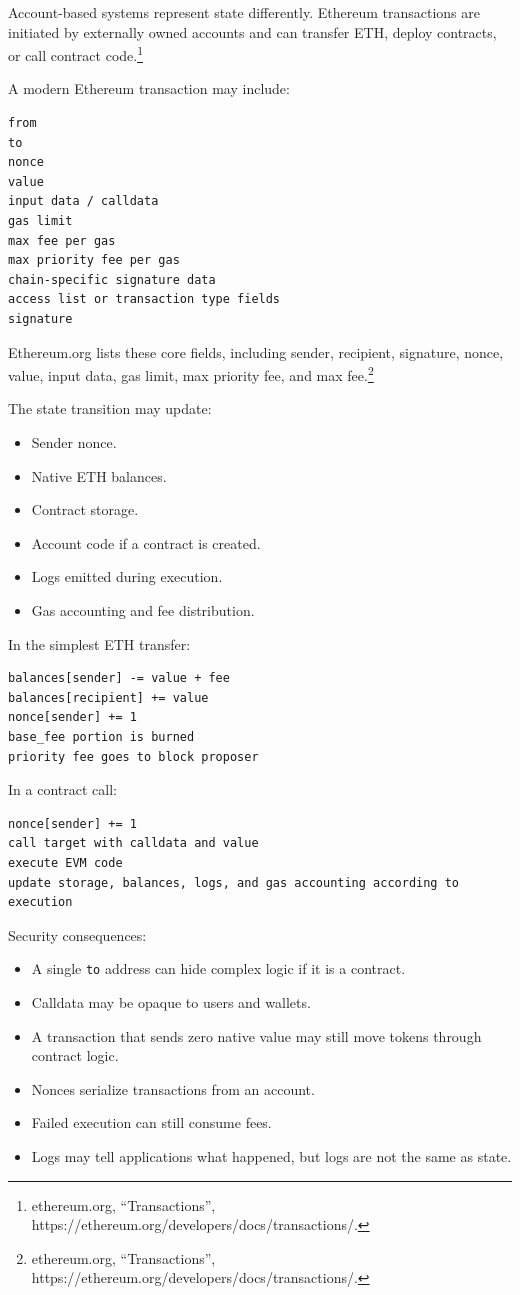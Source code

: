 Account-based systems represent state differently. Ethereum transactions
are initiated by externally owned accounts and can transfer ETH, deploy
contracts, or call contract code.\footnote{ethereum.org,
  ``Transactions'', https://ethereum.org/developers/docs/transactions/.}

A modern Ethereum transaction may include:

\begin{lstlisting}
from
to
nonce
value
input data / calldata
gas limit
max fee per gas
max priority fee per gas
chain-specific signature data
access list or transaction type fields
signature
\end{lstlisting}

Ethereum.org lists these core fields, including sender, recipient,
signature, nonce, value, input data, gas limit, max priority fee, and
max fee.\footnote{ethereum.org, ``Transactions'',
  https://ethereum.org/developers/docs/transactions/.}

The state transition may update:

\begin{itemize}
\tightlist
\item
  Sender nonce.
\item
  Native ETH balances.
\item
  Contract storage.
\item
  Account code if a contract is created.
\item
  Logs emitted during execution.
\item
  Gas accounting and fee distribution.
\end{itemize}

In the simplest ETH transfer:

\begin{lstlisting}
balances[sender] -= value + fee
balances[recipient] += value
nonce[sender] += 1
base_fee portion is burned
priority fee goes to block proposer
\end{lstlisting}

In a contract call:

\begin{lstlisting}
nonce[sender] += 1
call target with calldata and value
execute EVM code
update storage, balances, logs, and gas accounting according to execution
\end{lstlisting}

Security consequences:

\begin{itemize}
\tightlist
\item
  A single \passthrough{\lstinline!to!} address can hide complex logic
  if it is a contract.
\item
  Calldata may be opaque to users and wallets.
\item
  A transaction that sends zero native value may still move tokens
  through contract logic.
\item
  Nonces serialize transactions from an account.
\item
  Failed execution can still consume fees.
\item
  Logs may tell applications what happened, but logs are not the same as
  state.
\end{itemize}

